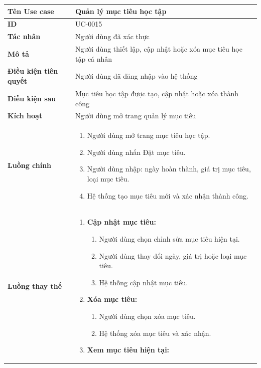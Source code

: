 {
\renewcommand{\arraystretch}{1.5}

\begin{tabularx}{\textwidth}{|>{\raggedright\arraybackslash}X|>{\raggedright\arraybackslash}X|}
\hline
\textbf{Tên Use case} & Quản lý mục tiêu học tập \\
\hline
\textbf{ID} & UC-0015 \\
\hline
\textbf{Tác nhân} & Người dùng đã xác thực \\
\hline
\textbf{Mô tả} & Người dùng thiết lập, cập nhật hoặc xóa mục tiêu học tập cá nhân \\
\hline
\textbf{Điều kiện tiên quyết} & Người dùng đã đăng nhập vào hệ thống \\
\hline
\textbf{Điều kiện sau} & Mục tiêu học tập được tạo, cập nhật hoặc xóa thành công \\
\hline
\textbf{Kích hoạt} & Người dùng mở trang quản lý mục tiêu \\
\hline
\textbf{Luồng chính} &
\begin{enumerate}
    \item Người dùng mở trang mục tiêu học tập.
    \item Người dùng nhấn Đặt mục tiêu.
    \item Người dùng nhập: ngày hoàn thành, giá trị mục tiêu, loại mục tiêu.
    \item Hệ thống tạo mục tiêu mới và xác nhận thành công.
\end{enumerate} \\
\hline
\textbf{Luồng thay thế} &
\begin{enumerate}
    \item \textbf{Cập nhật mục tiêu:}
    \begin{enumerate}
        \item[2A.] Người dùng chọn chỉnh sửa mục tiêu hiện tại.
        \item[3A.] Người dùng thay đổi ngày, giá trị hoặc loại mục tiêu.
        \item[4A.] Hệ thống cập nhật mục tiêu.
    \end{enumerate}
    \item \textbf{Xóa mục tiêu:}
    \begin{enumerate}
        \item[2B.] Người dùng chọn xóa mục tiêu.
        \item[3B.] Hệ thống xóa mục tiêu và xác nhận.
    \end{enumerate}
    \item \textbf{Xem mục tiêu hiện tại:}

\end{enumerate}
\end{tabularx}}
